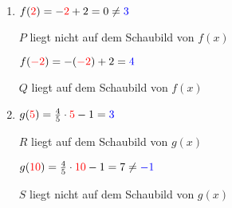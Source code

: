 \newpage
\begin{Answer}[ref=punktprobeA1]

	\begin{minipage}{0.5\textwidth}
		\begin{enumerate}[label=\alph*)]
			\item \(f(\textcolor{red}{2})=-\textcolor{red}{2}+2=0\neq\textcolor{blue}{3}\)

			\(P\) liegt nicht auf dem Schaubild von \(f(x)\)

			\(f(\textcolor{red}{-2})=-\left(\textcolor{red}{-2}\right)+2=\textcolor{blue}{4}\)

			\(Q\) liegt auf dem Schaubild von \(f(x)\)
		\end{enumerate}
	\end{minipage}%
	\begin{minipage}{0.5\textwidth}
		\begin{enumerate}[label=\alph*)]
			\setcounter{enumi}{1}
			\item \(g(\textcolor{red}{5})=\tfrac{4}{5}\cdot\textcolor{red}{5}-1=\textcolor{blue}{3}\)

			\(R\) liegt auf dem Schaubild von \(g(x)\)

			\(g(\textcolor{red}{10})=\tfrac{4}{5}\cdot\textcolor{red}{10}-1=7\neq\textcolor{blue}{-1}\)

			\(S\) liegt nicht auf dem Schaubild von \(g(x)\)
		\end{enumerate}
	\end{minipage}%
\end{Answer}
\vspace{1cm}
